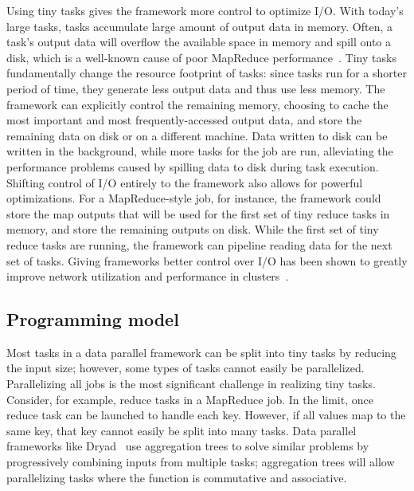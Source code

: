Using tiny tasks gives the framework more control to optimize I/O.
With
today's large tasks, tasks accumulate large amount of output data in memory.
Often, a task's output data will overflow the available space in memory
and spill onto a disk, which is a well-known cause of poor MapReduce
performance~\cite{lipcon2012optimizing}. Tiny tasks fundamentally change the
resource footprint of tasks: since tasks run for a shorter period of time,
they generate less output data and thus use less memory. The framework can
explicitly control the remaining memory, choosing to cache the most important
and most frequently-accessed output data, and store the remaining data on disk
or on a different machine. Data written to disk can be written in the
background, while more tasks for the job are run, alleviating the performance
problems caused by spilling data to disk during task execution.
Shifting control of I/O entirely to the framework also allows for
powerful optimizations.  For a MapReduce-style job, for instance, the
framework could store the map outputs that will be used for the first set of
tiny reduce tasks in memory, and store the remaining outputs on disk. While
the first set of tiny reduce tasks are running, the framework can pipeline
reading data for the next set of tasks.  Giving frameworks better control over
I/O has been shown
to greatly improve network utilization and performance in
clusters~\cite{chowdhury2011managing, chowdhury2012coflow}.

\subsection{Programming model}
\label{sec:prog}
Most tasks in a data parallel framework can be split into tiny tasks by
reducing the input size; however, some types of tasks cannot easily be
parallelized. Parallelizing all jobs is the most significant challenge
in realizing tiny tasks. 
Consider, for example, reduce tasks in a MapReduce job. In the limit,
once reduce task can be launched to handle each key. However, if all
values map to the same key, that key cannot easily be split into many
tasks.
Data parallel frameworks like Dryad~\cite{yu2008dryadlinq} use aggregation trees to solve
similar problems by progressively combining inputs from multiple tasks;
aggregation trees will allow parallelizing tasks where the function
is commutative and associative.


